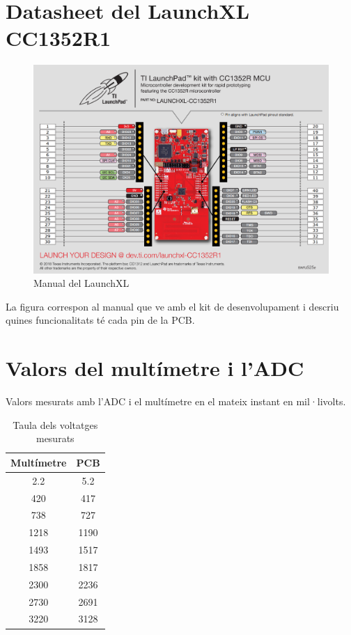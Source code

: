 \chapter{Datasheet del LaunchXL CC1352R1}
\label{datasheet}

\begin{figure}[h!]
	\begin{center}
		\includegraphics[width=\textwidth]{./images/pinout.PNG}
			\caption{Manual del LaunchXL}
	\end{center}
\end{figure}

La figura correspon al manual que ve amb el kit de desenvolupament i descriu quines funcionalitats té cada pin de la PCB.


\chapter{Valors del multímetre i l'ADC}
\label{raw_adc}

Valors mesurats amb l'ADC i el multímetre en el mateix instant en mil·livolts.

\begin{table}[!h]
	\begin{center}
		\begin{tabular}{|c|c|}
			\hline
			Multímetre			&	PCB		\\	\hline
			2.2			&	5.2		\\	\hline
			420			&	417		\\	\hline
			738			&	727		\\	\hline
			1218			&	1190		\\	\hline
			1493			&	1517		\\	\hline
			1858			&	1817		\\	\hline
			2300			&	2236		\\	\hline
			2730			&	2691		\\	\hline
			3220			&	3128		\\	\hline
		\end{tabular}
	\end{center}
	\caption{Taula dels voltatges mesurats}
\end{table}
